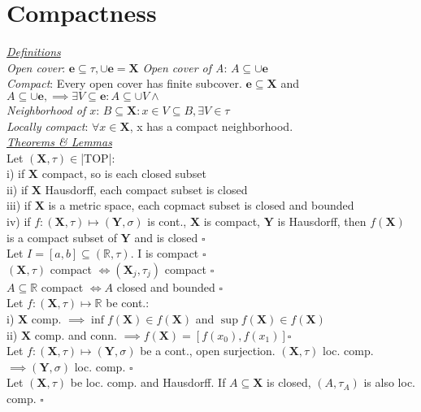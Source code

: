 \section{Compactness}
\underline{\emph{Definitions}}\\
\emph{Open cover}: $\mathbf{e}\subseteq\tau,\cup\mathbf{e}=\mathbf{X}$
\emph{Open cover of A}:
$A\subseteq\cup\mathbf{e}$\\
\emph{Compact}:
Every open cover has finite subcover. $\mathbf{e}\subseteq\mathbf{X}$ and $A\subseteq\cup\mathbf{e},\implies\exists V\subseteq\mathbf{e}:A\subseteq\cup V \land$\\
\emph{Neighborhood of $x$}: $B\subseteq\mathbf{X}:x\in V\subseteq B,\exists V\in\tau$\\
\emph{Locally compact}: $\forall x\in\mathbf{X}$, x has a compact neighborhood.
\\\underline{\emph{Theorems \& Lemmas}}\\
Let $(\mathbf{X},\tau)\in$|TOP|: \\
i) if $\mathbf{X}$ compact, so is each closed subset\\
ii) if $\mathbf{X}$ Hausdorff, each compact subset is closed\\
iii) if $\mathbf{X}$ is a metric space, each copmact subset is closed and bounded\\
iv) if $f:(\mathbf{X},\tau)\mapsto(\mathbf{Y},\sigma)$ is cont., $\mathbf{X}$ is compact, $\mathbf{Y}$ is Hausdorff, then $f(\mathbf{X})$ is a compact subset of $\mathbf{Y}$ and is closed $\square$\\
Let $I=[a,b]\subseteq(\mathbb{R},\tau)$. I is compact $\square$\\
$(\mathbf{X},\tau)$ compact $\iff(\mathbf{X}_j,\tau_j)$ compact $\square$\\
$A\subseteq\mathbb{R}$ compact $\iff A$ closed and bounded $\square$\\
Let $f:(\mathbf{X},\tau)\mapsto\mathbb{R}$ be cont.:\\
i) $\mathbf{X}$ comp. $\implies\inf f(\mathbf{X})\in f(\mathbf{X})$ and $\sup f(\mathbf{X})\in f(\mathbf{X})$\\
ii) $\mathbf{X}$ comp. and conn. $\implies f(\mathbf{X})=[f(x_0),f(x_1)]\square$\\
Let $f:(\mathbf{X},\tau)\mapsto(\mathbf{Y},\sigma)$ be a cont., open surjection. $(\mathbf{X},\tau)$ loc. comp. $\implies(\mathbf{Y},\sigma)$ loc. comp. $\square$\\
Let $(\mathbf{X},\tau)$ be loc. comp. and Hausdorff. If $A\subseteq\mathbf{X}$ is closed, $(A,\tau_A)$ is also loc. comp. $\square$\\
